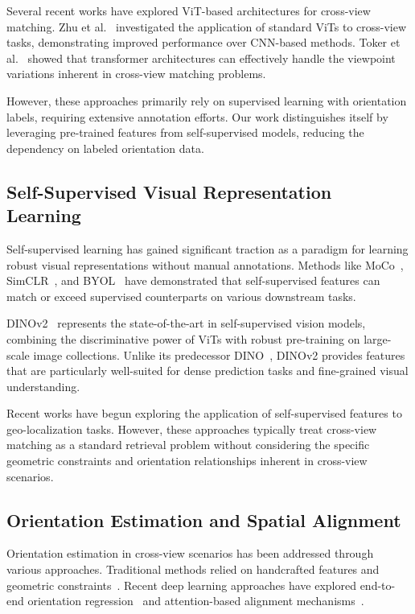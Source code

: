 Several recent works have explored ViT-based architectures for cross-view matching. Zhu et al.~\cite{zhu2023vigor} investigated the application of standard ViTs to cross-view tasks, demonstrating improved performance over CNN-based methods. Toker et al.~\cite{toker2021coming} showed that transformer architectures can effectively handle the viewpoint variations inherent in cross-view matching problems.

However, these approaches primarily rely on supervised learning with orientation labels, requiring extensive annotation efforts. Our work distinguishes itself by leveraging pre-trained features from self-supervised models, reducing the dependency on labeled orientation data.

\subsection{Self-Supervised Visual Representation Learning}

Self-supervised learning has gained significant traction as a paradigm for learning robust visual representations without manual annotations. Methods like MoCo~\cite{he2020momentum}, SimCLR~\cite{chen2020simple}, and BYOL~\cite{grill2020bootstrap} have demonstrated that self-supervised features can match or exceed supervised counterparts on various downstream tasks.

DINOv2~\cite{oquab2023dinov2} represents the state-of-the-art in self-supervised vision models, combining the discriminative power of ViTs with robust pre-training on large-scale image collections. Unlike its predecessor DINO~\cite{caron2021emerging}, DINOv2 provides features that are particularly well-suited for dense prediction tasks and fine-grained visual understanding.

Recent works have begun exploring the application of self-supervised features to geo-localization tasks. However, these approaches typically treat cross-view matching as a standard retrieval problem without considering the specific geometric constraints and orientation relationships inherent in cross-view scenarios.

\subsection{Orientation Estimation and Spatial Alignment}

Orientation estimation in cross-view scenarios has been addressed through various approaches. Traditional methods relied on handcrafted features and geometric constraints~\cite{bansal2011ultra,lin2015learning}. Recent deep learning approaches have explored end-to-end orientation regression~\cite{workman2015predicting} and attention-based alignment mechanisms~\cite{shi2020where}.

